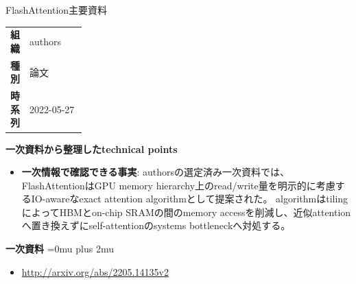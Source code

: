\begin{technicalnote}{FlashAttention}{主要資料}
\begingroup
\begin{tabularx}{\linewidth}{@{}>{\bfseries}p{0.22\linewidth}X@{}}
組織 & authors \\
種別 & 論文 \\
時系列 & 2022-05-27 \\
\end{tabularx}
\smallskip
{\bfseries 一次資料から整理したtechnical points}
\begin{itemize}[leftmargin=1.5em,itemsep=0.35em]
\item \textbf{一次情報で確認できる事実}: authorsの選定済み一次資料では、FlashAttentionはGPU memory hierarchy上のread/write量を明示的に考慮するIO-awareなexact attention algorithmとして提案された。 algorithmはtilingによってHBMとon-chip SRAMの間のmemory accessを削減し、近似attentionへ置き換えずにself-attentionのsystems bottleneckへ対処する。
\end{itemize}
\begin{minipage}{\linewidth}
\begin{samepage}
{\bfseries 一次資料}
\begingroup\sloppy
\Urlmuskip=0mu plus 2mu\relax
\begin{itemize}[leftmargin=1.5em,itemsep=0.25em]
\item {\scriptsize\url{http://arxiv.org/abs/2205.14135v2}}
\end{itemize}
\endgroup
\end{samepage}
\end{minipage}
\endgroup
\end{technicalnote}
\medskip

